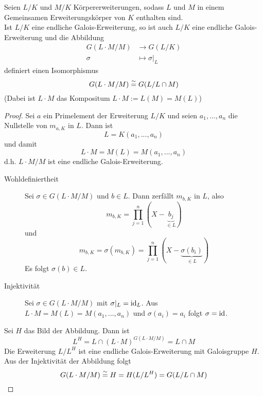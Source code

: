 	\begin{satz}[Translationssatz]
		Seien $L/K$ und $M/K$ Körpererweiterungen, sodass $L$ und $M$ in einem Gemeinsamen Erweiterungskörper von $K$ enthalten sind.\\
		Ist $L/K$ eine endliche Galois-Erweiterung, so ist auch $L/K$ eine endliche Galois-Erweiterung und die Abbildung
		\begin{align*}
		G(L\cdot M/M)&\to G(L/K)\\
		\sigma&\mapsto\sigma|_L
		\end{align*}
		definiert einen Isomorphismus 
		\[G({L\cdot M}/M)\overset{\sim}{=} G(L/{L\cap M})\]
		(Dabei ist $L\cdot M$ das Kompositum $L\cdot M:=L(M)=M(L)$)
	\end{satz}
	\begin{proof}
		Sei $a$ ein Primelement der Erweiterung $L/K$ und seien $a_1,...,a_n$ die Nullstelle von $m_{a,K}$ in $L$. Dann ist
		\[L=K(a_1,...,a_n)\]
		und damit
		\[L\cdot M=M(L)=M(a_1,...,a_n)\]
		d.h. ${L\cdot M}/M$ ist eine endliche Galois-Erweiterung.\\
		\begin{description}
			\item[Wohldefiniertheit] Sei $\sigma\in G({L\cdot M}/M)$ und $b\in L$. Dann zerfällt $m_{b,K}$ in $L$, also
			\[m_{b,K}=\prod_{j=1}^n(X-\underbrace{b_j}_{\in L})\]
			und
			\[m_{b,K}=\sigma(m_{b,K})=\prod_{j=1}^{n}(X-\underbrace{\sigma(b_i)}_{\in L})\]
			Es folgt $\sigma(b)\in L$.\\
			\item[Injektivität] Sei $\sigma\in G({L\cdot M}/M)$ mit $\sigma|_L=\operatorname{id}_L$. Aus $L\cdot M=M(L)=M(a_1,...,a_n)$ und $\sigma(a_i)=a_i$ folgt $\sigma=\operatorname{id}$.
		\end{description}
		Sei $H$ das Bild der Abbildung. Dann ist
		\[L^H=L\cap (L\cdot M)^{G({L\cdot M}/M)}=L\cap M\]
		Die Erweiterung $L/L^H$ ist eine endliche Galois-Erweiterung mit Galoisgruppe $H$. Aus der Injektivität der Abbildung folgt
		\[G({L\cdot M}/M)\overset{\sim}{=} H=H(L/L^H)=G(L/{L\cap M})\]
	\end{proof}

